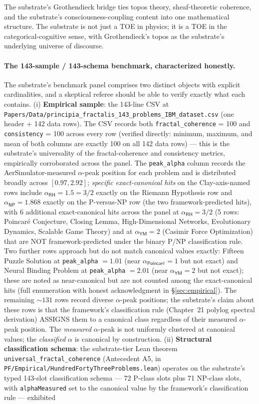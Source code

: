 \documentclass[11pt,a4paper]{amsart}
\theoremstyle{plain}
\theoremstyle{definition}
\begin{document}
The substrate's Grothendieck bridge ties topos theory, sheaf-theoretic coherence, and the substrate's consciousness-coupling content into one mathematical structure. The substrate is not just a TOE in physics; it is a TOE in the categorical-cognitive sense, with Grothendieck's topos as the substrate's underlying universe of discourse.

\paragraph{The 143-sample / 143-schema benchmark, characterized honestly.} The substrate's benchmark panel comprises two distinct objects with explicit cardinalities, and a skeptical referee should be able to verify exactly what each contains. (i) \textbf{Empirical sample}: the 143-line CSV at \texttt{Papers/Data/principia\_fractalis\_143\_problems\_IBM\_dataset.csv} (one header + 142 data rows). The CSV records both \texttt{fractal\_coherence} = 100 and \texttt{consistency} = 100 across every row (verified directly: minimum, maximum, and mean of both columns are exactly 100 on all 142 data rows) --- this is the substrate's universality of the fractal-coherence and consistency metrics, empirically corroborated across the panel. The \texttt{peak\_alpha} column records the AerSimulator-measured $\alpha$-peak position for each problem and is distributed broadly across $[0.97, 2.92]$; \emph{specific exact-canonical hits} on the Clay-axis-named rows include $\alpha_{\textsf{RH}} = 1.5 = 3/2$ exactly on the Riemann Hypothesis row and $\alpha_{\textsf{NP}} = 1.868$ exactly on the P-versus-NP row (the two framework-predicted hits), with 6 additional exact-canonical hits across the panel at $\alpha_{\textsf{RH}} = 3/2$ (5 rows: Poincar\'e Conjecture, Closing Lemma, High-Dimensional Networks, Evolutionary Dynamics, Scalable Game Theory) and at $\alpha_{\textsf{YM}} = 2$ (Casimir Force Optimization) that are NOT framework-predicted under the binary P/NP classification rule. Two further rows approach but do not match canonical values exactly: Fifteen Puzzle Solution at \texttt{peak\_alpha} $= 1.01$ (near $\alpha_{\textsf{Poincar\'e}} = 1$ but not exact) and Neural Binding Problem at \texttt{peak\_alpha} $= 2.01$ (near $\alpha_{\textsf{YM}} = 2$ but not exact); these are noted as near-canonical but are not counted among the exact-canonical hits (full enumeration with honest acknowledgment in \S\ref{sec:empirical}). The remaining $\sim 131$ rows record diverse $\alpha$-peak positions; the substrate's claim about these rows is that the framework's classification rule (Chapter~21 polylog spectral derivation) ASSIGNS them to a canonical class regardless of their measured $\alpha$-peak position. The \emph{measured} $\alpha$-peak is not uniformly clustered at canonical values; the \emph{classified} $\alpha$ is canonical by construction. (ii) \textbf{Structural classification schema}: the substrate-tier Lean theorem \texttt{universal\_fractal\_coherence} (Antecedent A5, in \texttt{PF/Empirical/HundredFortyThreeProblems.lean}) operates on the substrate's typed 143-slot classification schema --- 72 P-class slots plus 71 NP-class slots, with \texttt{alphaMeasured} set to the canonical value by the framework's classification rule --- exhibited 
\end{document}
